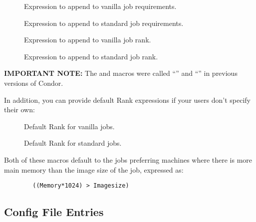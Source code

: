 \begin{description}
  
\item[] \label{param:AppendReqVanilla}
  Expression to append to vanilla job requirements.
  
\item[] \label{param:AppendReqStandard}
  Expression to append to standard job requirements.

\item[] \label{param:AppendRankStandard}
  Expression to append to vanilla job rank.

\item[] \label{param:AppendRankVanilla}
  Expression to append to standard job rank.

\end{description}

\textbf{IMPORTANT NOTE:} The  and 
 macros were called
``'' and
``'' in previous versions of Condor.

In addition, you can provide default Rank expressions if your users
don't specify their own:

\begin{description}

\item[] \label{param:DefaultRankVanilla}
  Default Rank for vanilla jobs.  

\item[] \label{param:DefaultRankStandard}
  Default Rank for standard jobs.

\end{description}

Both of these macros default to the jobs preferring machines where
there is more main memory than the image size of the job, expressed
as:

\begin{verbatim}
        ((Memory*1024) > Imagesize)
\end{verbatim}


\subsection{ Config File Entries}
\label{sec:Preen-Config-File-Entries}


